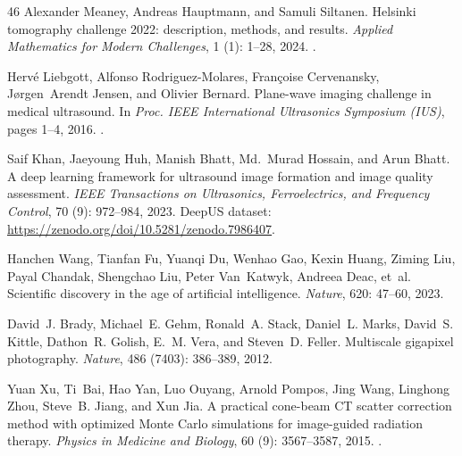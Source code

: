 \documentclass[11pt]{article}
\begin{document}
\begin{thebibliography}{46}
Alexander Meaney, Andreas Hauptmann, and Samuli Siltanen.
\newblock Helsinki tomography challenge 2022: description, methods, and
  results.
\newblock \emph{Applied Mathematics for Modern Challenges}, 1
  (1): 1--28, 2024.
\newblock {}.

Herv{\'e} Liebgott, Alfonso Rodriguez-Molares, Fran{\c{c}}oise Cervenansky,
  J{\o}rgen~Arendt Jensen, and Olivier Bernard.
\newblock Plane-wave imaging challenge in medical ultrasound.
\newblock In \emph{Proc. IEEE International Ultrasonics Symposium (IUS)}, pages
  1--4, 2016.
\newblock {}.

Saif Khan, Jaeyoung Huh, Manish Bhatt, Md.~Murad Hossain, and Arun Bhatt.
\newblock A deep learning framework for ultrasound image formation and image
  quality assessment.
\newblock \emph{IEEE Transactions on Ultrasonics, Ferroelectrics, and Frequency
  Control}, 70 (9): 972--984, 2023.
\newblock DeepUS dataset: \url{https://zenodo.org/doi/10.5281/zenodo.7986407}.

Hanchen Wang, Tianfan Fu, Yuanqi Du, Wenhao Gao, Kexin Huang, Ziming Liu, Payal
  Chandak, Shengchao Liu, Peter Van~Katwyk, Andreea Deac, et~al.
\newblock Scientific discovery in the age of artificial intelligence.
\newblock \emph{Nature}, 620: 47--60, 2023{}.

David~J. Brady, Michael~E. Gehm, Ronald~A. Stack, Daniel~L. Marks, David~S.
  Kittle, Dathon~R. Golish, E.~M. Vera, and Steven~D. Feller.
\newblock Multiscale gigapixel photography.
\newblock \emph{Nature}, 486 (7403): 386--389, 2012.

Yuan Xu, Ti~Bai, Hao Yan, Luo Ouyang, Arnold Pompos, Jing Wang, Linghong Zhou,
  Steve~B. Jiang, and Xun Jia.
\newblock A practical cone-beam {CT} scatter correction method with optimized
  {M}onte {C}arlo simulations for image-guided radiation therapy.
\newblock \emph{Physics in Medicine and Biology}, 60 (9):
  3567--3587, 2015.
\newblock {}.


\end{thebibliography}
\end{document}
